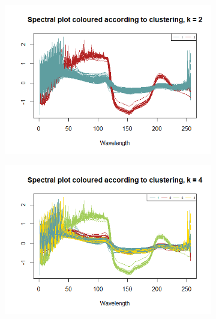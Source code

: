 \documentclass[12pt]{article}
\begin{document}
\begin{figure}[h!]
  \begin{subfigure}[b]{0.33\linewidth}
      \centering
      \includegraphics[width=\textwidth]{../images/project2/spectraByClusters_pam2.png}
   \caption{}\label{fig:spectraByClusters_pam2}
  \end{subfigure}%
  \begin{subfigure}[b]{0.33\linewidth}
      \centering
   \includegraphics[width=\textwidth]{../images/project2/spectraByClusters_pam4.png}
   \caption{}\label{fig:spectraByClusters_pam4}
  \end{subfigure}%
  \begin{subfigure}[b]{0.33\linewidth}
    \centering

\end{subfigure}
\end{figure}
\end{document}

